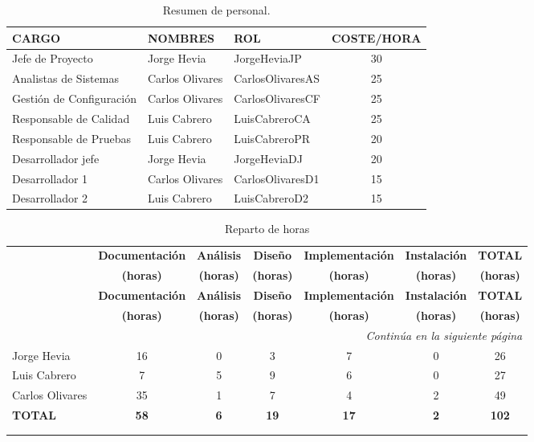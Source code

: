 \begin{table}[H]
\begin{center}
\begin{tabular}{l l l c}

\textbf{CARGO} & \textbf{NOMBRES} & \textbf{ROL} & \textbf{COSTE/HORA}\\ \hline \hline
Jefe de Proyecto & Jorge Hevia & JorgeHeviaJP & 30  \\
Analistas de Sistemas & Carlos Olivares & CarlosOlivaresAS & 25\\
Gestión de Configuración & Carlos Olivares & CarlosOlivaresCF & 25\\
Responsable de Calidad & Luis Cabrero & LuisCabreroCA & 25\\
Responsable de Pruebas & Luis Cabrero & LuisCabreroPR & 20\\
Desarrollador jefe & Jorge Hevia & JorgeHeviaDJ & 20\\
Desarrollador 1 & Carlos Olivares & CarlosOlivaresD1 & 15\\
Desarrollador 2 & Luis Cabrero & LuisCabreroD2 & 15\\ \hline \hline
\end{tabular}
\caption{Resumen de personal.}
\label{tab:personal}
\end{center}
\end{table}



\begin{center}
\begin{longtable}{lcccccc}

& \textbf{Documentación}	&	\textbf{Análisis}	&	\textbf{Diseño}	&	\textbf{Implementación}	&	\textbf{Instalación}	&	\textbf{TOTAL} \\
& \textbf{(horas)}	&	\textbf{(horas)}	&	\textbf{(horas)}	&	\textbf{(horas)}	&	\textbf{(horas)}	&	\textbf{(horas)} \\
\hline
\hline
\endfirsthead
& \textbf{Documentación}	&	\textbf{Análisis}	&	\textbf{Diseño}	&	\textbf{Implementación}	&	\textbf{Instalación}	&	\textbf{TOTAL} \\
& \textbf{(horas)}	&	\textbf{(horas)}	&	\textbf{(horas)}	&	\textbf{(horas)}	&	\textbf{(horas)}	&	\textbf{(horas)} \\
\hline
\hline
\endhead

\hline \multicolumn{7}{r}{\textit{Continúa en la siguiente página}} \\
\endfoot
\endlastfoot

Jorge Hevia	&	16	&	0	&	3	&	7	&	0	&	26	\\
Luis Cabrero &	7	&	5	&	9	&	6	&	0	&	27	\\
Carlos Olivares &	35	&	1	&	7	&	4	&	2	&	49	\\	\hline \hline
\textbf{TOTAL}	&	\textbf{58}	&	\textbf{6}	&	\textbf{19}	&	\textbf{17}	&\textbf{2}	&	\textbf{102}	\\	\hline

\caption{Reparto de horas}\\
\label{tab:repHoras}
\end{longtable}
\end{center}




